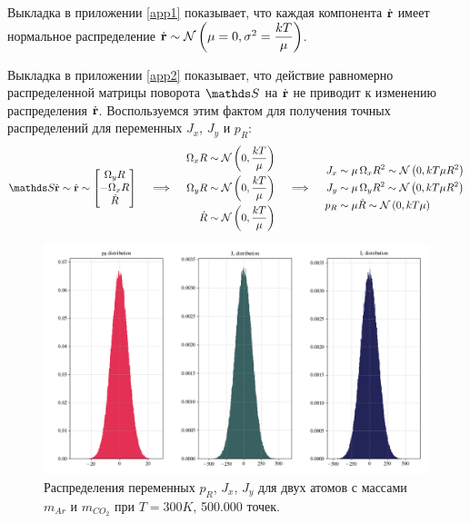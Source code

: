 Выкладка в приложении \ref{app1} показывает, что каждая компонента $\dot{\mathbf{r}}$ имеет нормальное распределение $\dot{\mathbf{r}} \sim \mathcal{N} \left( \mu = 0, \sigma^2 = \displaystyle \frac{kT}{\mu} \right)$. \par
Выкладка в приложении \ref{app2} показывает, что действие равномерно распределенной матрицы поворота $\bbS$ на $\dot{\mathbf{r}}$ не приводит к изменению распределения $\dot{\mathbf{r}}$. Воспользуемся этим фактом для получения точных распределений для переменных $J_x$, $J_y$ и $p_R$: 
\begin{gather}
	\bbS \dot{\mf{r}} \sim \dot{\mf{r}} \sim
	\begin{bmatrix}
		\Omega_y R \\
		- \Omega_x R \\
		\dot{R}
	\end{bmatrix}
	\quad \implies \quad
	\begin{aligned}
			\Omega_x R &\sim \mN \lb 0, \frac{k T}{\mu} \rb \\
			\Omega_y R &\sim \mN \lb 0, \frac{k T}{\mu} \rb \\
			\dot{R} &\sim \mN \lb 0, \frac{k T}{\mu} \rb 
	\end{aligned} \quad \implies \quad  
	\begin{aligned}
			J_x &\sim \mu \, \Omega_x R^2 \sim \mN \lb 0, k T \mu R^2 \rb \\
			J_y &\sim \mu \, \Omega_y R^2 \sim \mN \lb 0, k T \mu R^2 \rb \\
			p_R &\sim \mu \dot{R} \sim \mN \lb 0, k T \mu \rb  
	\end{aligned} \label{distr_exact}
\end{gather}

\begin{figure}[ht!]
		\includegraphics[width=\textwidth]{../pictures/diatomicsDistributions.png}
		\caption{Распределения переменных $p_R$, $J_x$, $J_y$ для двух атомов с массами $m_{Ar}$ и $m_{CO_2}$ при $T = 300 K$, 500.000 точек.}
\end{figure}


